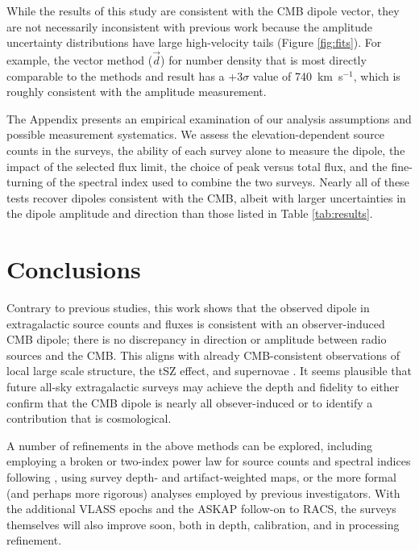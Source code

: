 \documentclass[twocolumn]{aastex63}
\begin{document}
While the results of this study are consistent with the CMB dipole vector, they are not necessarily inconsistent with
  previous work because the amplitude uncertainty distributions have large high-velocity tails (Figure \ref{fig:fits}).
  For example, the vector method ($\vec{d}$) for number density that is most directly comparable to
  the \citet{secrest2021} methods and result has a +3$\sigma$ value of 740~km~s$^{-1}$, which
  is roughly consistent with the \citet{secrest2021} amplitude measurement.  

The Appendix presents an empirical examination of our analysis assumptions and possible measurement systematics.
  We assess the elevation-dependent source counts in the surveys, the ability of each survey alone to measure the dipole,
  the impact of the selected flux limit, the choice of peak versus total flux, and the fine-turning of the spectral
  index used to combine the two surveys.  Nearly all of these tests recover dipoles consistent with the CMB, albeit with
  larger uncertainties in the dipole amplitude and direction than those listed in Table \ref{tab:results}.



\section{\label{sec:conclusions}Conclusions}

Contrary to previous studies, this work shows that the observed dipole in extragalactic source counts and fluxes
is consistent with an observer-induced CMB dipole; there is no discrepancy in direction or amplitude
between radio sources and the CMB.   This aligns with already CMB-consistent observations of local large scale structure, the tSZ effect, and supernovae \citep{rowan-robinson1990,lavaux2010,akrami2020,horstmann2021}.
It seems plausible that future all-sky extragalactic surveys may achieve the
depth and fidelity to either confirm that the CMB dipole is nearly all obsever-induced or to identify a contribution that
is cosmological.  

A number of refinements in the above methods can be explored, including employing a broken or two-index power law
for source counts and spectral indices following \citet{siewert2021},
using survey depth- and artifact-weighted maps, or the more formal (and perhaps more rigorous) analyses
employed by previous investigators.  
With the additional VLASS epochs and the ASKAP follow-on to RACS, the surveys themselves
will also improve soon, both in depth, calibration, and in processing refinement.  
\end{document}
